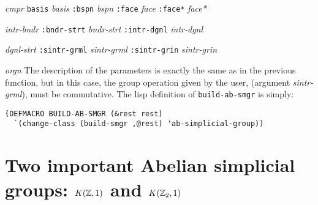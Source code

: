 \hspace {0.60cm}{\tt :cmpr} {\em cmpr} {\tt basis} {\em basis} {\tt :bspn} {\em bspn} {\tt :face} {\em face}
             {\tt :face*} {\em face*}  \par
\hspace {0.60cm}{\tt :intr-bndr} {\em intr-bndr} {\tt :bndr-strt} {\em bndr-strt} {\tt :intr-dgnl} {\em intr-dgnl} \par
\hspace {0.60cm}{\tt :dgnl-strt} {\em dgnl-strt} {\tt :sintr-grml} {\em sintr-grml} {\tt :sintr-grin} {\em sintr-grin} \par
\hspace {0.60cm}{\tt :orgn} {\em orgn}
\vskip 0.35cm
The description of the parameters is exactly the same as in the previous function, but in this case,
the group operation given by the user, (argument {\em sintr-grml}), must be commutative.
The lisp definition of {\tt build-ab-smgr} is simply:
{\footnotesize\begin{verbatim}
(DEFMACRO BUILD-AB-SMGR (&rest rest)
  `(change-class (build-smgr ,@rest) 'ab-simplicial-group))
\end{verbatim}}

\section {Two important Abelian simplicial groups: $K({{\Bbb Z}}, 1)$ and $K({{\Bbb Z}}_2, 1)$}

